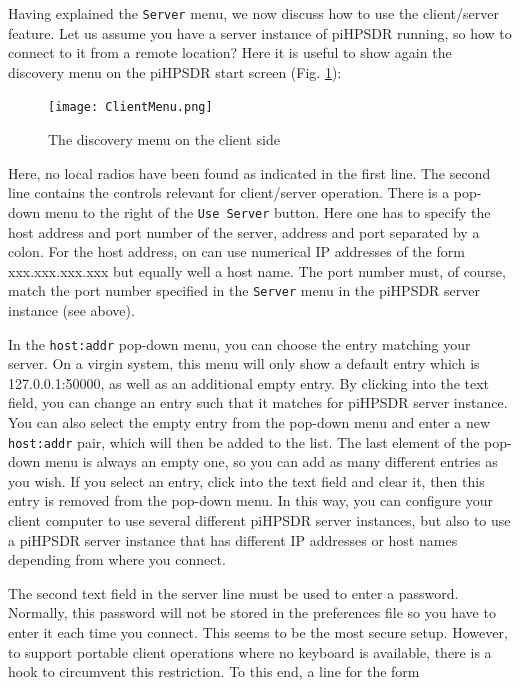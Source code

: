 \documentclass[12pt]{book}
\def\rett#1{\texttt{\color{red}#1}}
\def\bltt#1{\texttt{\color{blue}#1}}
\def\pH{pi\-HPSDR\xspace}
\begin{document}
Having explained the \bltt{Server} menu, we now discuss how to use the client/server feature.
Let us assume you have a server instance of \pH running, so how to connect  to it from a  remote location?
Here it is useful to show again the discovery menu on the \pH start screen (Fig. \ref{fig:clientmenu}):

\begin{figure}[ht]
\center
\texttt{[image: ClientMenu.png]}
\caption{The discovery menu on the client side}
\label{fig:clientmenu}
\end{figure}

Here, no local radios have been found as indicated in the first line. The second line contains the controls
relevant for  client/server operation. There is a pop-down menu to the right of the \rett{Use Server} button.
Here one has to specify the host address and port number of the server, address and port separated by a colon.
For the host address, on can use numerical IP addresses of the form xxx.xxx.xxx.xxx but equally well a
host name. The port number must, of course, match the port number specified in the \bltt{Server} menu in
the \pH server instance (see above).

In the \texttt{host:addr} pop-down menu, you can choose the entry matching your server. On a virgin system, this menu
will  only show a default entry which is 127.0.0.1:50000, as well as an additional empty entry.
 By clicking into the text field, you
can change an entry such that it matches for \pH server instance. You can also select the empty entry from
the pop-down menu and enter a new \texttt{host:addr} pair, which will then be added to the list.
 The last element of
the pop-down menu is always an empty one, so you can add as many different entries as you wish. If you select
an entry, click  into the text  field and clear it, then this entry is  removed from the pop-down menu.
In this way, you can configure your client computer to use several different \pH server instances, but also
to use a \pH server instance that has different IP addresses or host names depending from where you connect.

The second text field in the server line must be used to enter a password. Normally, this password will not be
stored in the preferences file so you have to enter it each time you connect. This seems to be the most
secure setup. However, to support portable client operations where no keyboard is available, there is
a hook to circumvent this restriction. To this end, a line for the form
\end{document}
